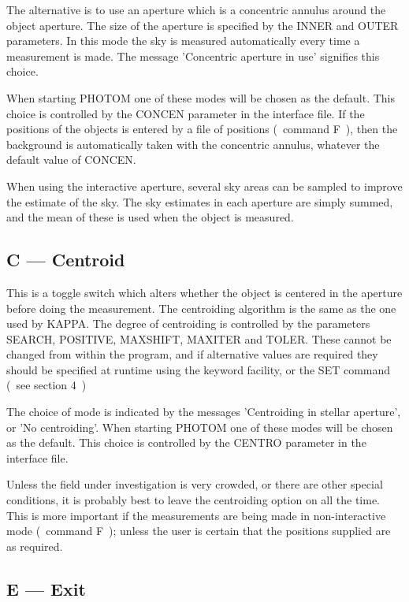 The alternative is to use an aperture which is a concentric annulus
around the object aperture. The size of the aperture is specified by
the INNER and OUTER parameters. In this mode the sky is measured
automatically every time a measurement is made. The message
'Concentric aperture in use' signifies this choice.

When starting PHOTOM one of these modes will be chosen as the default.
This choice is controlled by the CONCEN parameter in the interface file.
If the positions of the objects is entered by a file of positions
(~command F~), then the background is automatically taken with the
concentric annulus, whatever the default value of CONCEN.

When using the interactive aperture, several sky areas can be sampled
to improve the estimate of the sky. The sky estimates in each aperture
are simply summed, and the mean of these is used when the object is
measured.

\subsection{C --- Centroid}

This is a toggle switch which alters whether the object is centered in
the aperture before doing the measurement. The centroiding algorithm is
the same as the one used by KAPPA. The degree of centroiding is
controlled by the parameters SEARCH, POSITIVE, MAXSHIFT, MAXITER and
TOLER. These cannot be changed from within the program, and if
alternative values are required they should be specified at runtime
using the keyword facility, or the SET command (~see section 4~)

The choice of mode is indicated by the messages 'Centroiding in stellar
aperture', or 'No centroiding'. When starting PHOTOM one of these modes
will be chosen as the default. This choice is controlled by the CENTRO
parameter in the interface file.

Unless the field under investigation is very crowded, or there are other
special conditions, it is probably best to leave the centroiding option
on all the time. This is more important if the measurements are being
made in non-interactive mode (~command F~); unless the user is certain
that the positions supplied are as required.

\subsection{E --- Exit}

